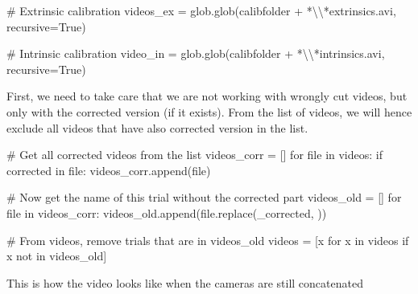 \documentclass[
  letterpaper,
  DIV=11,
  numbers=noendperiod]{scrreprt}
\newenvironment{Shaded}{\begin{snugshade}}{\end{snugshade}}
\newcommand{\BuiltInTok}[1]{\textcolor[rgb]{0.00,0.23,0.31}{#1}}
\newcommand{\CharTok}[1]{\textcolor[rgb]{0.13,0.47,0.30}{#1}}
\newcommand{\CommentTok}[1]{\textcolor[rgb]{0.37,0.37,0.37}{#1}}
\newcommand{\ControlFlowTok}[1]{\textcolor[rgb]{0.00,0.23,0.31}{#1}}
\newcommand{\KeywordTok}[1]{\textcolor[rgb]{0.00,0.23,0.31}{#1}}
\newcommand{\NormalTok}[1]{\textcolor[rgb]{0.00,0.23,0.31}{#1}}
\newcommand{\OperatorTok}[1]{\textcolor[rgb]{0.37,0.37,0.37}{#1}}
\newcommand{\StringTok}[1]{\textcolor[rgb]{0.13,0.47,0.30}{#1}}
\newcommand{\VariableTok}[1]{\textcolor[rgb]{0.07,0.07,0.07}{#1}}
\begin{document}
\begin{Shaded}
\begin{Highlighting}[]
\CommentTok{\# Extrinsic calibration}
\NormalTok{videos\_ex }\OperatorTok{=}\NormalTok{ glob.glob(calibfolder }\OperatorTok{+} \StringTok{\textquotesingle{}*}\CharTok{\textbackslash{}\textbackslash{}}\StringTok{*extrinsics.avi\textquotesingle{}}\NormalTok{, recursive}\OperatorTok{=}\VariableTok{True}\NormalTok{)}

\CommentTok{\# Intrinsic calibration}
\NormalTok{video\_in }\OperatorTok{=}\NormalTok{ glob.glob(calibfolder }\OperatorTok{+} \StringTok{\textquotesingle{}*}\CharTok{\textbackslash{}\textbackslash{}}\StringTok{*intrinsics.avi\textquotesingle{}}\NormalTok{, recursive}\OperatorTok{=}\VariableTok{True}\NormalTok{)}
\end{Highlighting}
\end{Shaded}

First, we need to take care that we are not working with wrongly cut
videos, but only with the corrected version (if it exists). From the
list of videos, we will hence exclude all videos that have also
corrected version in the list.

\begin{Shaded}
\begin{Highlighting}[]
\CommentTok{\# Get all corrected videos from the list}
\NormalTok{videos\_corr }\OperatorTok{=}\NormalTok{ []}
\ControlFlowTok{for} \BuiltInTok{file} \KeywordTok{in}\NormalTok{ videos:}
    \ControlFlowTok{if} \StringTok{\textquotesingle{}corrected\textquotesingle{}} \KeywordTok{in} \BuiltInTok{file}\NormalTok{:}
\NormalTok{        videos\_corr.append(}\BuiltInTok{file}\NormalTok{)}

\CommentTok{\# Now get the name of this trial without the corrected part}
\NormalTok{videos\_old }\OperatorTok{=}\NormalTok{ []}
\ControlFlowTok{for} \BuiltInTok{file} \KeywordTok{in}\NormalTok{ videos\_corr:}
\NormalTok{    videos\_old.append(}\BuiltInTok{file}\NormalTok{.replace(}\StringTok{\textquotesingle{}\_corrected\textquotesingle{}}\NormalTok{, }\StringTok{\textquotesingle{}\textquotesingle{}}\NormalTok{))}

\CommentTok{\# From videos, remove trials that are in videos\_old}
\NormalTok{videos }\OperatorTok{=}\NormalTok{ [x }\ControlFlowTok{for}\NormalTok{ x }\KeywordTok{in}\NormalTok{ videos }\ControlFlowTok{if}\NormalTok{ x }\KeywordTok{not} \KeywordTok{in}\NormalTok{ videos\_old]}
\end{Highlighting}
\end{Shaded}

This is how the video looks like when the cameras are still concatenated
\end{document}
